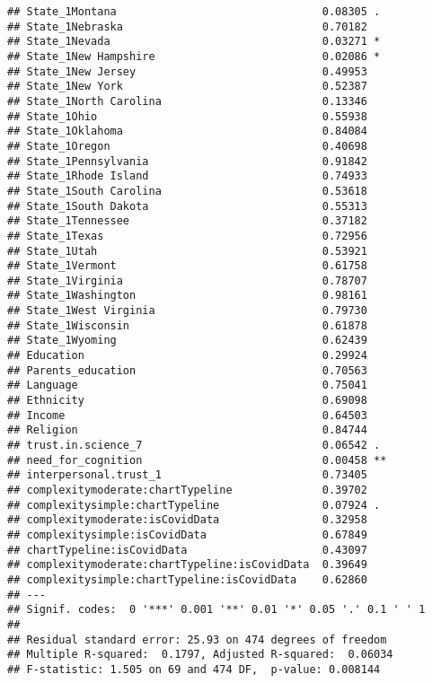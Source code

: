 \documentclass[
]{article}
\begin{document}
\begin{verbatim}
## State_1Montana                                0.08305 . 
## State_1Nebraska                               0.70182   
## State_1Nevada                                 0.03271 * 
## State_1New Hampshire                          0.02086 * 
## State_1New Jersey                             0.49953   
## State_1New York                               0.52387   
## State_1North Carolina                         0.13346   
## State_1Ohio                                   0.55938   
## State_1Oklahoma                               0.84084   
## State_1Oregon                                 0.40698   
## State_1Pennsylvania                           0.91842   
## State_1Rhode Island                           0.74933   
## State_1South Carolina                         0.53618   
## State_1South Dakota                           0.55313   
## State_1Tennessee                              0.37182   
## State_1Texas                                  0.72956   
## State_1Utah                                   0.53921   
## State_1Vermont                                0.61758   
## State_1Virginia                               0.78707   
## State_1Washington                             0.98161   
## State_1West Virginia                          0.79730   
## State_1Wisconsin                              0.61878   
## State_1Wyoming                                0.62439   
## Education                                     0.29924   
## Parents_education                             0.70563   
## Language                                      0.75041   
## Ethnicity                                     0.69098   
## Income                                        0.64503   
## Religion                                      0.84744   
## trust.in.science_7                            0.06542 . 
## need_for_cognition                            0.00458 **
## interpersonal.trust_1                         0.73405   
## complexitymoderate:chartTypeline              0.39702   
## complexitysimple:chartTypeline                0.07924 . 
## complexitymoderate:isCovidData                0.32958   
## complexitysimple:isCovidData                  0.67849   
## chartTypeline:isCovidData                     0.43097   
## complexitymoderate:chartTypeline:isCovidData  0.39649   
## complexitysimple:chartTypeline:isCovidData    0.62860   
## ---
## Signif. codes:  0 '***' 0.001 '**' 0.01 '*' 0.05 '.' 0.1 ' ' 1
## 
## Residual standard error: 25.93 on 474 degrees of freedom
## Multiple R-squared:  0.1797, Adjusted R-squared:  0.06034 
## F-statistic: 1.505 on 69 and 474 DF,  p-value: 0.008144
\end{verbatim}
\end{document}
